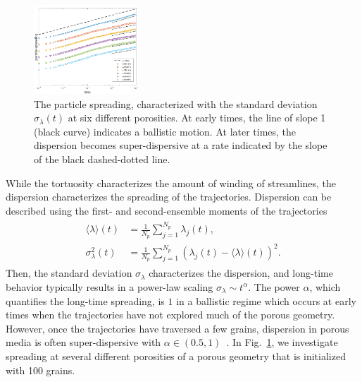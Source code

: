 \documentclass[11pt]{article}
\begin{document}
\begin{figure}
  \includegraphics[width=0.35\textwidth]{figs/100b_second_moment_long_ref}
  \caption{\label{fig:100dispersion} The particle spreading, characterized with the standard deviation $\sigma_\lambda(t)$ at six different porosities. At early times, the line of slope 1 (black curve) indicates a ballistic motion. At later times, the dispersion becomes super-dispersive at a rate indicated by the slope of the black dashed-dotted line.}
\end{figure}
While the tortuosity characterizes the amount of winding of streamlines, the dispersion characterizes the spreading of the trajectories.  Dispersion can be described using the first- and second-ensemble moments of the trajectories
\begin{align}
  \begin{split}
  \langle \lambda \rangle (t) &= \frac{1}{N_p} 
      \sum_{j=1}^{N_p} \lambda_j(t), \\ 
  \sigma_\lambda^{2}(t) &= \frac{1}{N_p}
    \sum_{j=1}^{N_p} (\lambda_j(t) - \langle \lambda \rangle(t))^2.
  \end{split}
\end{align}
Then, the standard deviation $\sigma_\lambda$ characterizes the
dispersion, and long-time behavior typically results in a power-law
scaling $\sigma_\lambda \sim t^{\alpha}$. The power $\alpha$, which
quantifies the long-time spreading, is $1$ in a ballistic regime which
occurs at early times when the trajectories have not explored much of
the porous geometry. However, once the trajectories have traversed a few
grains, dispersion in porous media is often super-dispersive with
$\alpha \in (0.5,1)$~\cite{dea-leb-den-tar-bol-dav2013}. In Fig.~\ref{fig:100dispersion}, we investigate spreading at several different porosities of a porous geometry that is initialized with 100 grains.
\end{document}
